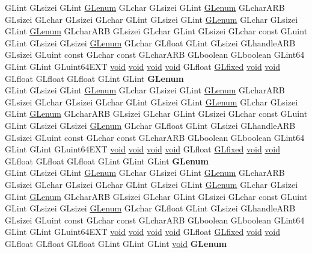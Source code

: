 \begin{DoxyCompactItemize}
\begin{tabbing}
\>GLint GLsizei GLint \hyperlink{interfacevoid}{GLenum} GLchar GLsizei GLint \hyperlink{interfacevoid}{GLenum} GLcharARB GLsizei GLchar GLsizei GLchar GLint GLsizei GLint \hyperlink{interfacevoid}{GLenum} GLchar GLsizei GLint \hyperlink{interfacevoid}{GLenum} GLcharARB GLsizei GLchar GLint GLsizei GLchar const GLuint GLint GLsizei GLsizei \hyperlink{interfacevoid}{GLenum} GLchar GLfloat GLint GLsizei GLhandleARB GLsizei GLuint const GLchar const GLcharARB GLboolean GLboolean GLint64 GLint GLint GLuint64EXT \hyperlink{interfacevoid}{void} \hyperlink{interfacevoid}{void} \hyperlink{interfacevoid}{void} \hyperlink{interfacevoid}{void} GLfloat \hyperlink{glheader_8h_ad6d3fa892df40dedf48ee6d84529ae5e}{GLfixed} \hyperlink{interfacevoid}{void} \hyperlink{interfacevoid}{void} GLfloat GLfloat GLfloat GLint GLint {\bfseries GLenum}\\
\>GLint GLsizei GLint \hyperlink{interfacevoid}{GLenum} GLchar GLsizei GLint \hyperlink{interfacevoid}{GLenum} GLcharARB GLsizei GLchar GLsizei GLchar GLint GLsizei GLint \hyperlink{interfacevoid}{GLenum} GLchar GLsizei GLint \hyperlink{interfacevoid}{GLenum} GLcharARB GLsizei GLchar GLint GLsizei GLchar const GLuint GLint GLsizei GLsizei \hyperlink{interfacevoid}{GLenum} GLchar GLfloat GLint GLsizei GLhandleARB GLsizei GLuint const GLchar const GLcharARB GLboolean GLboolean GLint64 GLint GLint GLuint64EXT \hyperlink{interfacevoid}{void} \hyperlink{interfacevoid}{void} \hyperlink{interfacevoid}{void} \hyperlink{interfacevoid}{void} GLfloat \hyperlink{glheader_8h_ad6d3fa892df40dedf48ee6d84529ae5e}{GLfixed} \hyperlink{interfacevoid}{void} \hyperlink{interfacevoid}{void} GLfloat GLfloat GLfloat GLint GLint GLint {\bfseries GLenum}\\
\>GLint GLsizei GLint \hyperlink{interfacevoid}{GLenum} GLchar GLsizei GLint \hyperlink{interfacevoid}{GLenum} GLcharARB GLsizei GLchar GLsizei GLchar GLint GLsizei GLint \hyperlink{interfacevoid}{GLenum} GLchar GLsizei GLint \hyperlink{interfacevoid}{GLenum} GLcharARB GLsizei GLchar GLint GLsizei GLchar const GLuint GLint GLsizei GLsizei \hyperlink{interfacevoid}{GLenum} GLchar GLfloat GLint GLsizei GLhandleARB GLsizei GLuint const GLchar const GLcharARB GLboolean GLboolean GLint64 GLint GLint GLuint64EXT \hyperlink{interfacevoid}{void} \hyperlink{interfacevoid}{void} \hyperlink{interfacevoid}{void} \hyperlink{interfacevoid}{void} GLfloat \hyperlink{glheader_8h_ad6d3fa892df40dedf48ee6d84529ae5e}{GLfixed} \hyperlink{interfacevoid}{void} \hyperlink{interfacevoid}{void} GLfloat GLfloat GLfloat GLint GLint GLint \hyperlink{interfacevoid}{void} {\bfseries GLenum}\\

\end{tabbing}
\end{DoxyCompactItemize}
